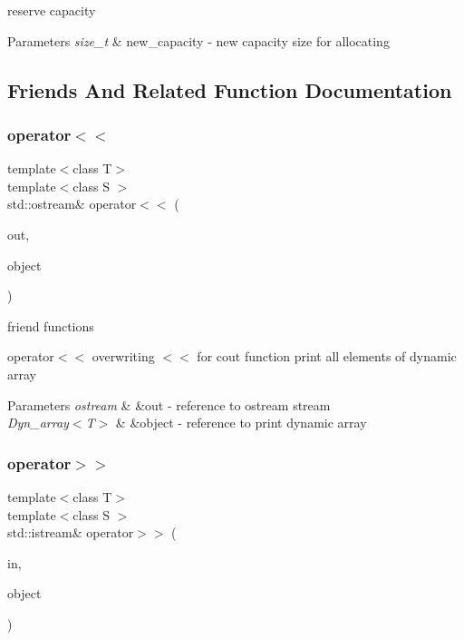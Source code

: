 reserve capacity 


\begin{DoxyParams}{Parameters}
{\em size\+\_\+t} & new\+\_\+capacity -\/ new capacity size for allocating \\
\hline
\end{DoxyParams}


\subsection{Friends And Related Function Documentation}
\mbox{\label{classDyn__array_aebc2873551e997f690220158398e5bf3}} 
\subsubsection{\texorpdfstring{operator$<$$<$}{operator<<}}
{\footnotesize\ttfamily template$<$class T$>$ \\
template$<$class S $>$ \\
std\+::ostream\& operator$<$$<$ (\begin{DoxyParamCaption}\item[{std\+::ostream \&}]{out,  }\item[{const \hyperlink{classDyn__array}{Dyn\+\_\+array}$<$ S $>$ \&}]{object }\end{DoxyParamCaption})\hspace{0.3cm}{\ttfamily [friend]}}



friend functions 

operator$<$$<$ overwriting $<$$<$ for cout function print all elements of dynamic array 
\begin{DoxyParams}{Parameters}
{\em ostream} & \&out -\/ reference to ostream stream \\
\hline
{\em Dyn\+\_\+array$<$\+T$>$} & \&object -\/ reference to print dynamic array \\
\hline
\end{DoxyParams}
\mbox{\label{classDyn__array_a3b9156ade0a68fef20fc21e06aed9cc0}} 
\subsubsection{\texorpdfstring{operator$>$$>$}{operator>>}}
{\footnotesize\ttfamily template$<$class T$>$ \\
template$<$class S $>$ \\
std\+::istream\& operator$>$$>$ (\begin{DoxyParamCaption}\item[{std\+::istream \&}]{in,  }\item[{\hyperlink{classDyn__array}{Dyn\+\_\+array}$<$ S $>$ \&}]{object }\end{DoxyParamCaption})\hspace{0.3cm}{\ttfamily [friend]}}



